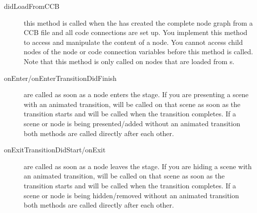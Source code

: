 \begin{description}
  \item[didLoadFromCCB] this method is called when the 
  has created the complete node graph from a CCB file and all code connections
  are set up. You implement this method to access and manipulate the content of
  a node. You cannot access child nodes of the node or code connection
  variables before this method is called. Note that this method is only called
  on nodes that are loaded from \ccbfile{}s.
  \item[onEnter/onEnterTransitionDidFinish] are called as soon as a node enters
  the stage. If you are presenting a scene with an animated transition,
   will be called on that scene as soon as the transition
  starts and  will be called when the transition
  completes. If a scene or node is being presented/added without an animated
  transition both methods are called directly after each other.
  \item[onExitTransitionDidStart/onExit] are called as soon as a node leaves the
  stage. If you are hiding a scene with an animated transition,
   will be called on that scene as soon as
  the transition starts and  will be called when the
  transition completes. If a scene or node is being hidden/removed without an
  animated transition both methods are called directly after each other.
\end{description}

